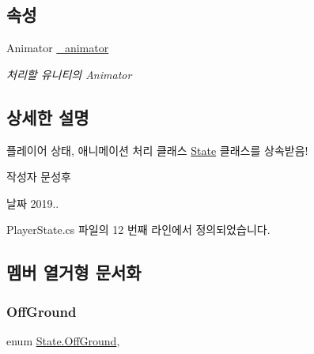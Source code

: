 \subsection*{속성}
\begin{DoxyCompactItemize}
\item 
Animator \mbox{\hyperlink{class_state_aff1dd03a1b3c63053b23371d6d70cd1a}{\+\_\+animator}}
\begin{DoxyCompactList}\small\item\em 처리할 유니티의 Animator \end{DoxyCompactList}\end{DoxyCompactItemize}


\subsection{상세한 설명}
플레이어 상태, 애니메이션 처리 클래스 \mbox{\hyperlink{class_state}{State}} 클래스를 상속받음! 

\begin{DoxyAuthor}{작성자}
문성후 
\end{DoxyAuthor}
\begin{DoxyDate}{날짜}
2019.. 
\end{DoxyDate}


Player\+State.\+cs 파일의 12 번째 라인에서 정의되었습니다.



\subsection{멤버 열거형 문서화}
\mbox{\label{class_state_a7d945e793324c017a973205564cf1a56}} 
\subsubsection{\texorpdfstring{OffGround}{OffGround}}
{\footnotesize\ttfamily enum \mbox{\hyperlink{class_state_a7d945e793324c017a973205564cf1a56}{State.\+Off\+Ground}}\hspace{0.3cm}{\ttfamily [strong]}, {\ttfamily [inherited]}}

